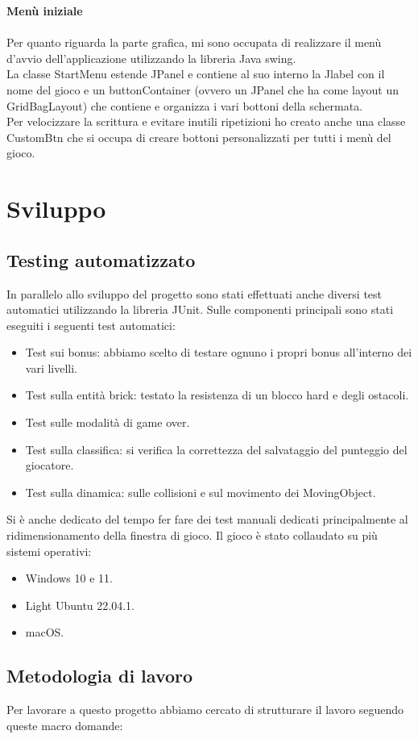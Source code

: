 \documentclass[a4paper,12pt]{report}
\begin{document}
\pagebreak
\textbf{Menù iniziale}\\
\\Per quanto riguarda la parte grafica, mi sono occupata di realizzare il menù d'avvio dell'applicazione utilizzando la libreria Java swing.
\\La classe StartMenu estende JPanel e contiene al suo interno la Jlabel con il nome del gioco e un buttonContainer (ovvero un JPanel che ha come layout un GridBagLayout) che contiene e organizza i vari bottoni della schermata.
\\Per velocizzare la scrittura e evitare inutili ripetizioni ho creato anche una classe CustomBtn che si occupa di creare bottoni personalizzati per tutti i menù del gioco.
\pagebreak
\chapter{Sviluppo}
\section{Testing automatizzato}
In parallelo allo sviluppo del progetto sono stati effettuati anche diversi test automatici utilizzando la libreria JUnit.
Sulle componenti principali sono stati eseguiti i seguenti test automatici:
\begin{itemize}
    \item Test sui bonus: abbiamo scelto di testare ognuno i propri bonus all'interno dei vari livelli.
    \item Test sulla entità brick: testato la resistenza di un blocco hard e degli ostacoli.
    \item Test sulle modalità di game over.
    \item Test sulla classifica: si verifica la correttezza del salvataggio del punteggio del giocatore.
    \item Test sulla dinamica: sulle collisioni e sul movimento dei MovingObject.
\end{itemize}
Si è anche dedicato del tempo fer fare dei test manuali dedicati principalmente al ridimensionamento della finestra di gioco.
Il gioco è stato collaudato su più sistemi operativi:
\begin{itemize}
    \item Windows 10 e 11.
    \item Light Ubuntu 22.04.1.
    \item macOS.
\end{itemize}

\section{Metodologia di lavoro}
Per lavorare
a questo progetto abbiamo cercato di strutturare il lavoro seguendo queste macro domande:
\end{document}
